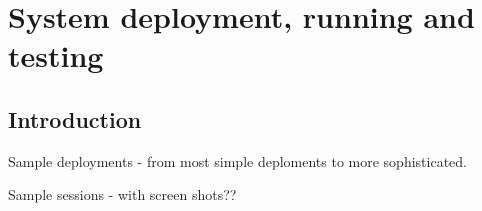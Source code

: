  
%


\chapter{System deployment, running and testing}
\label{cha:deployment}



\section{Introduction}
\label{sec:ch7_introdocution}

Sample deployments - from most simple deploments to more sophisticated.

Sample sessions - with screen shots??







